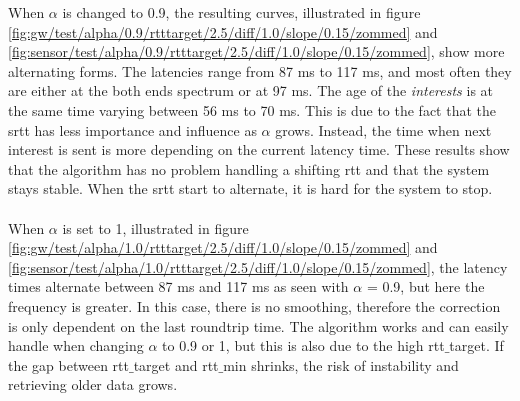 When $\alpha$ is changed to 0.9, the resulting curves, illustrated in figure \ref{fig:gw/test/alpha/0.9/rtttarget/2.5/diff/1.0/slope/0.15/zommed} and \ref{fig:sensor/test/alpha/0.9/rtttarget/2.5/diff/1.0/slope/0.15/zommed}, show more alternating forms. The latencies range from 87 ms to 117 ms, and most often they are either at the both ends spectrum or at 97 ms. The age of the \textit{interests} is at the same time varying between 56 ms to 70 ms. This is due to the fact that the srtt has less importance and influence as $\alpha$ grows. Instead, the time when next interest is sent is more depending on the current latency time. 
These results show that the algorithm has no problem handling a shifting rtt and that the system stays stable. When the srtt start to alternate, it is hard for the system to stop.\\\\
When $\alpha$ is set to 1, illustrated in figure \ref{fig:gw/test/alpha/1.0/rtttarget/2.5/diff/1.0/slope/0.15/zommed} and \ref{fig:sensor/test/alpha/1.0/rtttarget/2.5/diff/1.0/slope/0.15/zommed}, the latency times alternate between 87 ms and 117 ms as seen with $\alpha$ = 0.9, but here the frequency is greater. In this case, there is no smoothing, therefore the correction is only dependent on the last roundtrip time. The algorithm works and can easily handle when changing $\alpha$ to 0.9 or 1, but this is also due to the high rtt$\_$target.  If the gap between rtt$\_$target and rtt$\_$min shrinks, the risk of instability and retrieving older data grows.

